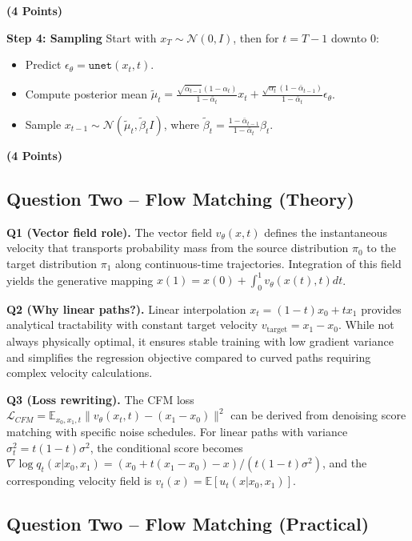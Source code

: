 \documentclass[a4paper,12pt]{article}
\begin{document}
\textbf{(4 Points)}

\textbf{Step 4: Sampling}
Start with $x_T \sim \mathcal{N}(0, I)$, then for $t = T-1$ downto $0$:
\begin{itemize}
    \item Predict $\epsilon_\theta = \texttt{unet}(x_t, t)$.
    \item Compute posterior mean $\tilde{\mu}_t = \frac{\sqrt{\bar{\alpha}_{t-1}} (1 - \alpha_t)}{1 - \bar{\alpha}_t} x_t + \frac{\sqrt{\alpha_t} (1 - \bar{\alpha}_{t-1})}{1 - \bar{\alpha}_t} \epsilon_\theta$.
    \item Sample $x_{t-1} \sim \mathcal{N}(\tilde{\mu}_t, \tilde{\beta}_t I)$, where $\tilde{\beta}_t = \frac{1 - \bar{\alpha}_{t-1}}{1 - \bar{\alpha}_t} \beta_t$.
\end{itemize}

\textbf{(4 Points)}

\subsection{Question Two -- Flow Matching (Theory)}

\textbf{Q1 (Vector field role).} The vector field $v_\theta(x, t)$ defines the instantaneous velocity that transports probability mass from the source distribution $\pi_0$ to the target distribution $\pi_1$ along continuous-time trajectories. Integration of this field yields the generative mapping $x(1) = x(0) + \int_0^1 v_\theta(x(t), t) dt$.

\textbf{Q2 (Why linear paths?).} Linear interpolation $x_t = (1-t)x_0 + t x_1$ provides analytical tractability with constant target velocity $v_{\text{target}} = x_1 - x_0$. While not always physically optimal, it ensures stable training with low gradient variance and simplifies the regression objective compared to curved paths requiring complex velocity calculations.

\textbf{Q3 (Loss rewriting).} The CFM loss $\mathcal{L}_{CFM} = \mathbb{E}_{x_0,x_1,t} \|v_\theta(x_t, t) - (x_1 - x_0)\|^2$ can be derived from denoising score matching with specific noise schedules. For linear paths with variance $\sigma_t^2 = t(1-t)\sigma^2$, the conditional score becomes $\nabla \log q_t(x|x_0,x_1) = (x_0 + t(x_1 - x_0) - x)/(t(1-t)\sigma^2)$, and the corresponding velocity field is $v_t(x) = \mathbb{E}[u_t(x|x_0,x_1)]$.

\subsection{Question Two -- Flow Matching (Practical)}
\end{document}
